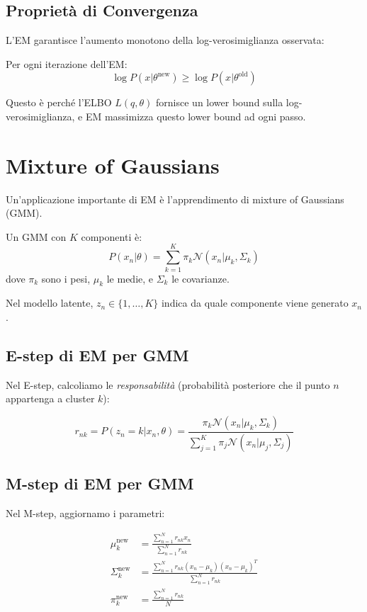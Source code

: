 \subsection{Proprietà di Convergenza}

L'EM garantisce l'aumento monotono della log-verosimiglianza osservata:

\begin{theorem}
  Per ogni iterazione dell'EM:
  \[\log P(x|\theta^{\text{new}}) \geq \log P(x|\theta^{\text{old}})\]
\end{theorem}

Questo è perché l'ELBO $L(q,\theta)$ fornisce un lower bound sulla log-verosimiglianza, e EM massimizza questo lower bound ad ogni passo.

\section{Mixture of Gaussians}

Un'applicazione importante di EM è l'apprendimento di mixture of Gaussians (GMM).

\begin{definition}
  Un GMM con $K$ componenti è:
  \[P(x_n|\theta) = \sum_{k=1}^K \pi_k \mathcal{N}(x_n | \mu_k, \Sigma_k)\]
  dove $\pi_k$ sono i pesi, $\mu_k$ le medie, e $\Sigma_k$ le covarianze.
\end{definition}

Nel modello latente, $z_n \in \{1, \ldots, K\}$ indica da quale componente viene generato $x_n$.

\subsection{E-step di EM per GMM}

Nel E-step, calcoliamo le \textit{responsabilità} (probabilità posteriore che il punto $n$ appartenga a cluster $k$):

\[r_{nk} = P(z_n = k | x_n, \theta) = \frac{\pi_k \mathcal{N}(x_n|\mu_k,\Sigma_k)}{\sum_{j=1}^K \pi_j \mathcal{N}(x_n|\mu_j,\Sigma_j)}\]

\subsection{M-step di EM per GMM}

Nel M-step, aggiornamo i parametri:

\begin{align}
  \mu_k^{\text{new}} &= \frac{\sum_{n=1}^N r_{nk} x_n}{\sum_{n=1}^N r_{nk}} \\
  \Sigma_k^{\text{new}} &= \frac{\sum_{n=1}^N r_{nk}(x_n - \mu_k)(x_n - \mu_k)^T}{\sum_{n=1}^N r_{nk}} \\
  \pi_k^{\text{new}} &= \frac{\sum_{n=1}^N r_{nk}}{N}
\end{align}

